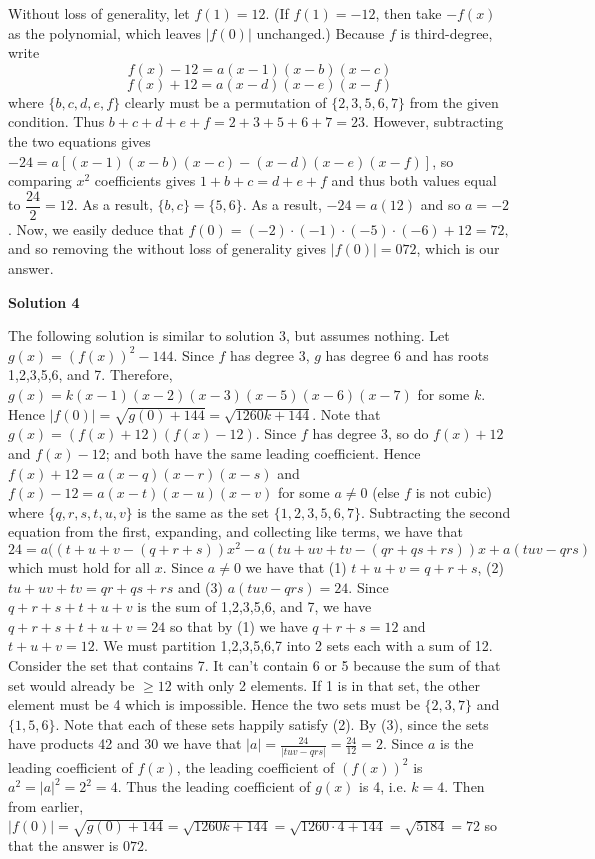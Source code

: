 \begin{enumerate}
Without loss of generality, let $f(1) = 12$. (If $f(1) = -12$, then take $-f(x)$ as the polynomial, which leaves $|f(0)|$ unchanged.) Because $f$ is third-degree, write
 \[f(x) - 12 = a(x - 1)(x - b)(x - c)\]
 \[f(x) + 12 = a(x - d)(x - e)(x - f)\]where $\{b, c, d, e, f \}$ clearly must be a permutation of $\{2, 3, 5, 6, 7\}$ from the given condition. Thus $b + c + d + e + f = 2 + 3 + 5 + 6 + 7 = 23.$ However, subtracting the two equations gives $-24 = a[(x - 1)(x - b)(x - c) - (x - d)(x - e)(x - f)]$, so comparing $x^2$ coefficients gives $1 + b + c = d + e + f$ and thus both values equal to $\dfrac{24}{2} = 12$. As a result, $\{b, c \} = \{5, 6 \}$. As a result, $-24 = a (12)$ and so $a = -2$. Now, we easily deduce that $f(0) = (-2) \cdot (-1) \cdot (-5) \cdot (-6) + 12 = 72,$ and so removing the without loss of generality gives $|f(0)| = \boxed{072}$, which is our answer.

 


 



\textbf{Solution 4}

The following solution is similar to solution 3, but assumes nothing. Let $g(x)=(f(x))^2-144$. Since $f$ has degree 3, $g$ has degree 6 and has roots 1,2,3,5,6, and 7. Therefore, $g(x)=k(x-1)(x-2)(x-3)(x-5)(x-6)(x-7)$ for some $k$. Hence $|f(0)|=\sqrt{g(0)+144}=\sqrt{1260k+144}$. Note that $g(x)=(f(x)+12)(f(x)-12)$. Since $f$ has degree 3, so do $f(x)+12$ and $f(x)-12$; and both have the same leading coefficient. Hence $f(x)+12=a(x-q)(x-r)(x-s)$ and $f(x)-12=a(x-t)(x-u)(x-v)$ for some $a\neq 0$ (else $f$ is not cubic) where $\{q,r,s,t,u,v\}$ is the same as the set $\{1,2,3,5,6,7\}$. Subtracting the second equation from the first, expanding, and collecting like terms, we have that 
 \[24=a((t+u+v-(q+r+s))x^2-a(tu+uv+tv-(qr+qs+rs))x+a(tuv-qrs)\]which must hold for all $x$. Since $a\neq 0$ we have that (1) $t+u+v=q+r+s$, (2) $tu+uv+tv=qr+qs+rs$ and (3) $a(tuv-qrs)=24$. Since $q+r+s+t+u+v$ is the sum of 1,2,3,5,6, and 7, we have $q+r+s+t+u+v=24$ so that by (1) we have $q+r+s=12$ and $t+u+v=12$. We must partition 1,2,3,5,6,7 into 2 sets each with a sum of 12. Consider the set that contains 7. It can't contain 6 or 5 because the sum of that set would already be $\geq 12$ with only 2 elements. If 1 is in that set, the other element must be 4 which is impossible. Hence the two sets must be $\{2,3,7\}$ and $\{1,5,6\}$. Note that each of these sets happily satisfy (2). By (3), since the sets have products 42 and 30 we have that $|a|=\frac{24}{|tuv-qrs|}=\frac{24}{12}=2$. Since $a$ is the leading coefficient of $f(x)$, the leading coefficient of $(f(x))^2$ is $a^2=|a|^2=2^2=4$. Thus the leading coefficient of $g(x)$ is 4, i.e. $k=4$. Then from earlier, $|f(0)|=\sqrt{g(0)+144}=\sqrt{1260k+144}=\sqrt{1260\cdot4+144}=\sqrt{5184}=72$ so that the answer is $\boxed{072}$.


\end{enumerate}
